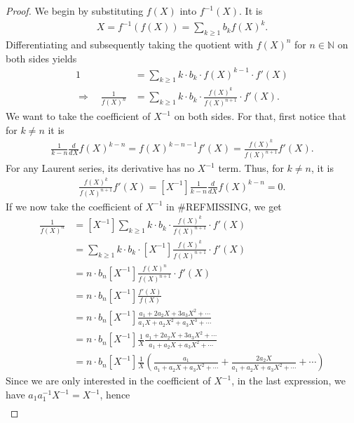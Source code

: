\documentclass[a4paper]{article}
\theoremstyle{definition}
\begin{document}
\begin{proof}
    We begin by substituting \(f(X)\) into \(f^{-1}(X)\). It is
    \begin{align*}
        X = f^{-1}(f(X)) = \sum_{k \geq 1} b_k f(X)^k \text{.}
    \end{align*}
    Differentiating and subsequently taking the quotient with \(f(X)^n\) for \(n \in \mathbb{N}\) on both sides yields
    \begin{align*}
        1 &= \sum_{k \geq 1} k \cdot b_k \cdot f(X)^{k - 1} \cdot f'(X) \\
        \Rightarrow \quad \frac{1}{f(X)^n} &= \sum_{k \geq 1} k \cdot b_k \cdot \frac{f(X)^{k}}{f(X)^{n+1}} \cdot f'(X) \text{.}
    \end{align*}
    We want to take the coefficient of \(X^{-1}\) on both sides. For that, first notice that for \(k \neq n\) it is
    \begin{align*}
        \frac{1}{k - n} \frac{d}{dX} f(X)^{k - n} = f(X)^{k - n -1} f'(X) = \frac{f(X)^{k}}{f(X)^{n + 1}} f'(X) \text{.}
    \end{align*}
    For any Laurent series, its derivative has no \(X^{-1}\) term. Thus, for \(k \neq n\), it is
    \begin{align*}
        [X^{-1}]\frac{f(X)^{k}}{f(X)^{n + 1}} f'(X) = [X^{-1}] \frac{1}{k - n} \frac{d}{dX} f(X)^{k - n} = 0 \text{.}
    \end{align*}
    If we now take the coefficient of \(X^{-1}\) in \#REFMISSING, we get
    \begin{align}
        [X^{-1}] \frac{1}{f(X)^n} &= [X^{-1}] \sum_{k \geq 1} k \cdot b_k \cdot \frac{f(X)^{k}}{f(X)^{n+1}} \cdot f'(X) \\
        &= \sum_{k \geq 1} k \cdot b_k \cdot [X^{-1}] \frac{f(X)^{k}}{f(X)^{n+1}} \cdot f'(X) \\
        &= n \cdot b_n [X^{-1}] \frac{f(X)^n}{f(X)^{n+1}} \cdot f'(X) \\
        &= n \cdot b_n [X^{-1}] \frac{f'(X)}{f(X)} \\
        &= n \cdot b_n [X^{-1}] \frac{a_1 + 2 a_2 X + 3 a_3 X^2 + \cdots}{a_1 X + a_2 X^2 + a_3 X^3 + \cdots} \\
        &= n \cdot b_n [X^{-1}] \frac{1}{X} \frac{a_1 + 2 a_2 X + 3 a_3 X^2 + \cdots}{a_1 + a_2 X + a_3 X^2 + \cdots} \\
        &= n \cdot b_n [X^{-1}] \frac{1}{X} \left(\frac{a_1}{a_1 + a_2 X + a_3 X^2 + \cdots} + \frac{2 a_2 X}{a_1 + a_2 X + a_3 X^2 + \cdots} + \cdots\right)
    \end{align}
    Since we are only interested in the coefficient of \(X^{-1}\), in the last expression, we have \(a_1 a_1^{-1} X^{-1} = X^{-1}\), hence
    \begin{align}
        [X^{-1}]
    \end{align}
\end{proof}
\end{document}
